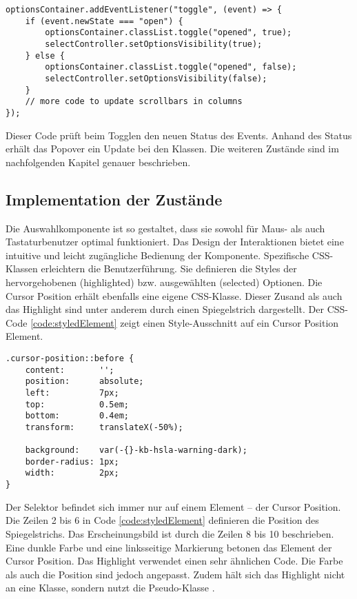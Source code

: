 \begin{lstlisting}[style = htmlcssjs, caption = Event-Handling für Popover-Toggle, label = code:popoverToggle]
optionsContainer.addEventListener("toggle", (event) => {
    if (event.newState === "open") {
        optionsContainer.classList.toggle("opened", true);
        selectController.setOptionsVisibility(true);
    } else {
        optionsContainer.classList.toggle("opened", false);
        selectController.setOptionsVisibility(false);
    }
    // more code to update scrollbars in columns
});
\end{lstlisting}

Dieser Code prüft beim Togglen den neuen Status des Events. 
Anhand des Status erhält das Popover ein Update bei den Klassen. 
Die weiteren Zustände sind im nachfolgenden Kapitel genauer beschrieben. 


\subsection{Implementation der Zustände}
\label{sec:implementStates}

Die Auswahlkomponente ist so gestaltet, dass sie sowohl für Maus- als auch Tastaturbenutzer optimal funktioniert. 
Das Design der Interaktionen bietet eine intuitive und leicht zugängliche Bedienung der Komponente. 
Spezifische CSS-Klassen erleichtern die Benutzerführung. 
Sie definieren die Styles der hervorgehobenen (highlighted) bzw. ausgewählten (selected) Optionen. 
Die Cursor Position erhält ebenfalls eine eigene CSS-Klasse. 
Dieser Zusand als auch das Highlight sind unter anderem durch einen Spiegelstrich dargestellt. 
Der CSS-Code \ref{code:styledElement} zeigt einen Style-Ausschnitt auf ein Cursor Position Element. 

\begin{lstlisting}[style = htmlcssjs, caption = Spiegelstrich der Cursor Position, label = code:styledElement]
.cursor-position::before {
    content:       '';
    position:      absolute;
    left:          7px;
    top:           0.5em;
    bottom:        0.4em;
    transform:     translateX(-50%);

    background:    var(-{}-kb-hsla-warning-dark);
    border-radius: 1px;
    width:         2px;
}
\end{lstlisting}

Der Selektor  befindet sich immer nur auf einem Element – der Cursor Position. 
Die Zeilen 2 bis 6 in Code \ref{code:styledElement} definieren die Position des Spiegelstrichs. 
Das Erscheinungsbild ist durch die Zeilen 8 bis 10 beschrieben. 
Eine dunkle Farbe und eine linksseitige Markierung betonen das Element der Cursor Position. 
Das Highlight verwendet einen sehr ähnlichen Code. 
Die Farbe als auch die Position sind jedoch angepasst. 
Zudem hält sich das Highlight nicht an eine Klasse, sondern nutzt die Pseudo-Klasse . 

